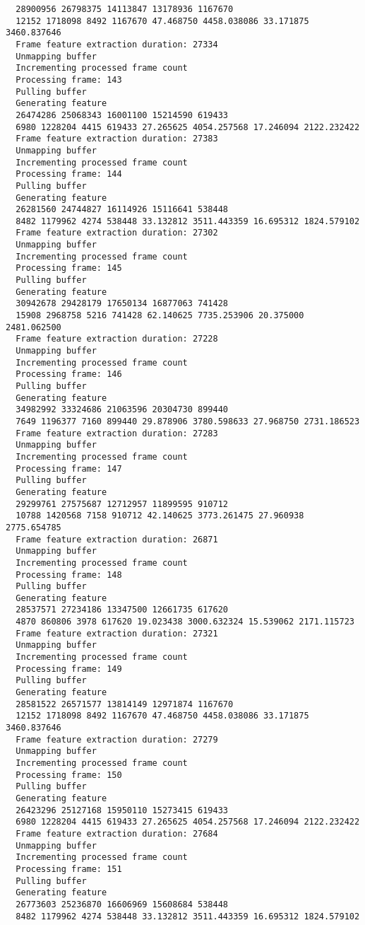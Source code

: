 \documentclass[12pt,oneside]{book}
\begin{document}
\begin{lstlisting}
  28900956 26798375 14113847 13178936 1167670
  12152 1718098 8492 1167670 47.468750 4458.038086 33.171875 3460.837646
  Frame feature extraction duration: 27334
  Unmapping buffer
  Incrementing processed frame count
  Processing frame: 143
  Pulling buffer
  Generating feature
  26474286 25068343 16001100 15214590 619433
  6980 1228204 4415 619433 27.265625 4054.257568 17.246094 2122.232422
  Frame feature extraction duration: 27383
  Unmapping buffer
  Incrementing processed frame count
  Processing frame: 144
  Pulling buffer
  Generating feature
  26281560 24744827 16114926 15116641 538448
  8482 1179962 4274 538448 33.132812 3511.443359 16.695312 1824.579102
  Frame feature extraction duration: 27302
  Unmapping buffer
  Incrementing processed frame count
  Processing frame: 145
  Pulling buffer
  Generating feature
  30942678 29428179 17650134 16877063 741428
  15908 2968758 5216 741428 62.140625 7735.253906 20.375000 2481.062500
  Frame feature extraction duration: 27228
  Unmapping buffer
  Incrementing processed frame count
  Processing frame: 146
  Pulling buffer
  Generating feature
  34982992 33324686 21063596 20304730 899440
  7649 1196377 7160 899440 29.878906 3780.598633 27.968750 2731.186523
  Frame feature extraction duration: 27283
  Unmapping buffer
  Incrementing processed frame count
  Processing frame: 147
  Pulling buffer
  Generating feature
  29299761 27575687 12712957 11899595 910712
  10788 1420568 7158 910712 42.140625 3773.261475 27.960938 2775.654785
  Frame feature extraction duration: 26871
  Unmapping buffer
  Incrementing processed frame count
  Processing frame: 148
  Pulling buffer
  Generating feature
  28537571 27234186 13347500 12661735 617620
  4870 860806 3978 617620 19.023438 3000.632324 15.539062 2171.115723
  Frame feature extraction duration: 27321
  Unmapping buffer
  Incrementing processed frame count
  Processing frame: 149
  Pulling buffer
  Generating feature
  28581522 26571577 13814149 12971874 1167670
  12152 1718098 8492 1167670 47.468750 4458.038086 33.171875 3460.837646
  Frame feature extraction duration: 27279
  Unmapping buffer
  Incrementing processed frame count
  Processing frame: 150
  Pulling buffer
  Generating feature
  26423296 25127168 15950110 15273415 619433
  6980 1228204 4415 619433 27.265625 4054.257568 17.246094 2122.232422
  Frame feature extraction duration: 27684
  Unmapping buffer
  Incrementing processed frame count
  Processing frame: 151
  Pulling buffer
  Generating feature
  26773603 25236870 16606969 15608684 538448
  8482 1179962 4274 538448 33.132812 3511.443359 16.695312 1824.579102

\end{lstlisting}
\end{document}
